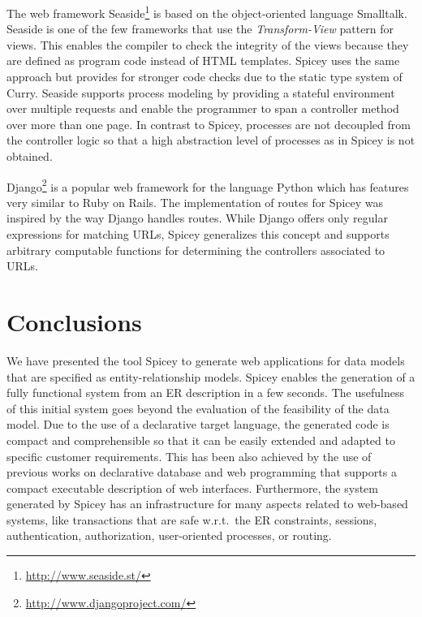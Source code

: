 \documentclass{tlp}
\renewcommand{\tt}{\usefont{OT1}{cmtt}{m}{n}\selectfont}
\begin{document}
The web framework Seaside\footnote{\tt\url{http://www.seaside.st/}}
is based on the object-oriented language Smalltalk.
Seaside is one of the few frameworks that use the
\emph{Transform-View} pattern for views. This enables the compiler to check
the integrity of the views because they are defined as program code
instead of HTML templates. Spicey uses the same approach but
provides for stronger code checks due to the static type system of Curry.
Seaside supports process modeling by providing a stateful environment
over multiple requests and enable the programmer to span a controller
method over more than one page. In contrast to Spicey, processes
are not decoupled from the controller logic so that a high abstraction
level of processes as in Spicey is not obtained.

Django\footnote{\tt\url{http://www.djangoproject.com/}}
is a popular web framework
for the language Python which has features very similar to Ruby on Rails. The
implementation of routes for Spicey was inspired by the way Django handles
routes. While Django offers only regular expressions for matching URLs, Spicey
generalizes this concept and supports arbitrary computable functions
for determining the controllers associated to URLs.

\section{Conclusions}
\label{sec:conclusions}

We have presented the tool Spicey to generate web applications for
data models that are specified as entity-relationship models.
Spicey enables the generation of a fully functional
system from an ER description in a few seconds.
The usefulness of this initial system goes beyond the evaluation of
the feasibility of the data model.
Due to the use of a declarative target language,
the generated code is compact and comprehensible so that
it can be easily extended and adapted
to specific customer requirements.
This has been also achieved by the use of previous works
on declarative database and web programming that
supports a compact executable description of web interfaces.
Furthermore, the system generated by Spicey has an infrastructure for
many aspects related to web-based systems, like transactions that are safe
w.r.t.\ the ER constraints, sessions, authentication,
authorization, user-oriented processes, or routing.
\end{document}
